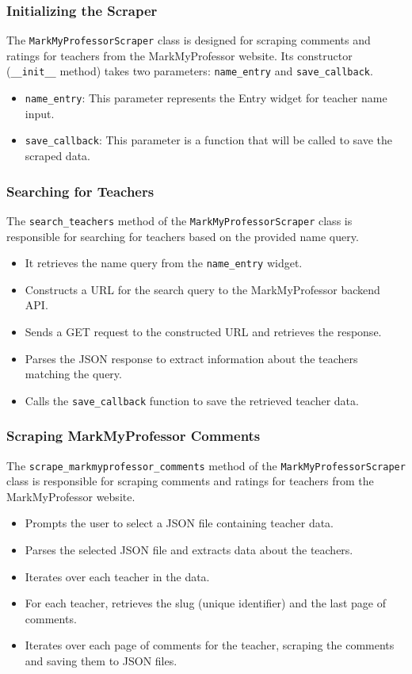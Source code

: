 \subsubsection*{Initializing the Scraper}
The \texttt{MarkMyProfessorScraper} class is designed for scraping comments and ratings for teachers from the MarkMyProfessor website. Its constructor (\texttt{\_\_init\_\_} method) takes two parameters: \texttt{name\_entry} and \texttt{save\_callback}.

\begin{itemize}
    \item \texttt{name\_entry}: This parameter represents the Entry widget for teacher name input.
    \item \texttt{save\_callback}: This parameter is a function that will be called to save the scraped data.
\end{itemize}

\subsubsection*{Searching for Teachers}
The \texttt{search\_teachers} method of the \texttt{MarkMyProfessorScraper} class is responsible for searching for teachers based on the provided name query.

\begin{itemize}
    \item It retrieves the name query from the \texttt{name\_entry} widget.
    \item Constructs a URL for the search query to the MarkMyProfessor backend API.
    \item Sends a GET request to the constructed URL and retrieves the response.
    \item Parses the JSON response to extract information about the teachers matching the query.
    \item Calls the \texttt{save\_callback} function to save the retrieved teacher data.
\end{itemize}

\subsubsection*{Scraping MarkMyProfessor Comments}
The \texttt{scrape\_markmyprofessor\_comments} method of the \texttt{MarkMyProfessorScraper} class is responsible for scraping comments and ratings for teachers from the MarkMyProfessor website.

\begin{itemize}
    \item Prompts the user to select a JSON file containing teacher data.
    \item Parses the selected JSON file and extracts data about the teachers.
    \item Iterates over each teacher in the data.
    \item For each teacher, retrieves the slug (unique identifier) and the last page of comments.
    \item Iterates over each page of comments for the teacher, scraping the comments and saving them to JSON files.
\end{itemize}

